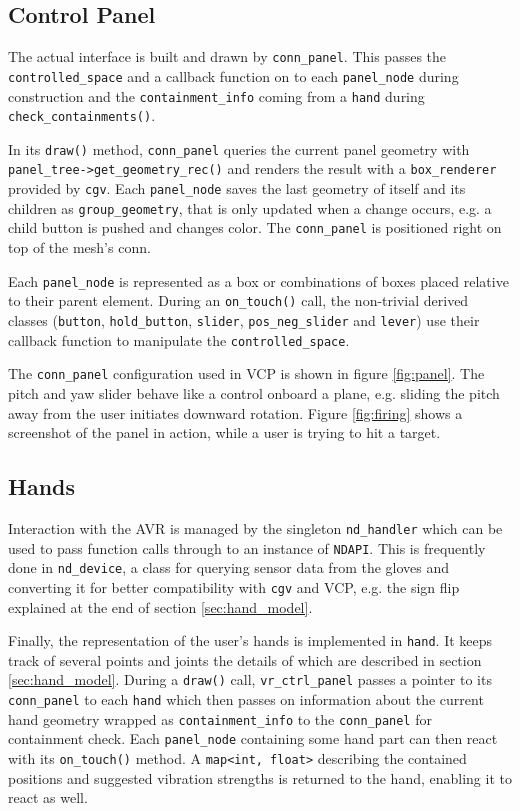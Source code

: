 \documentclass[hyperref, bachelorofscience]{cgvpub}
\begin{document}
\subsection{Control Panel}
The actual interface is built and drawn by \lstinline|conn_panel|. This passes the \lstinline|controlled_space| and a callback function on to each \lstinline|panel_node| during construction and the \lstinline|containment_info| coming from a \lstinline|hand| during \lstinline|check_containments()|. 

In its \lstinline|draw()| method, \lstinline|conn_panel| queries the current panel geometry with \lstinline|panel_tree->get_geometry_rec()| and renders the result with a \lstinline|box_renderer| provided by \lstinline|cgv|. Each \lstinline|panel_node| saves the last geometry of itself and its children as \lstinline|group_geometry|, that is only updated when a change occurs, e.g. a child button is pushed and changes color. The \lstinline|conn_panel| is positioned right on top of the mesh's conn.

Each \lstinline|panel_node| is represented as a box or combinations of boxes placed relative to their parent element. During an \lstinline|on_touch()| call, the non-trivial derived classes (\lstinline|button|, \lstinline|hold_button|, \lstinline|slider|, \lstinline|pos_neg_slider| and \lstinline|lever|) use their callback function to manipulate the \lstinline|controlled_space|. 

The \lstinline|conn_panel| configuration used in \gls{VCP} is shown in figure \ref{fig:panel}. The pitch and yaw slider behave like a control onboard a plane, e.g. sliding the pitch away from the user initiates downward rotation. Figure \ref{fig:firing} shows a screenshot of the panel in action, while a user is trying to hit a target.

\subsection{Hands} \label{sec:devel:structure:hands}
Interaction with the \Gls{AVR} is managed by the singleton \lstinline|nd_handler| which can be used to pass function calls through to an instance of \lstinline|NDAPI|. This is frequently done in \lstinline|nd_device|, a class for querying sensor data from the gloves and converting it for better compatibility with \lstinline|cgv| and \gls{VCP}, e.g. the sign flip explained at the end of section \ref{sec:hand_model}.

Finally, the representation of the user's hands is implemented in \lstinline|hand|. It keeps track of several points and joints the details of which are described in section \ref{sec:hand_model}. During a \lstinline|draw()| call, \lstinline|vr_ctrl_panel| passes a pointer to its \lstinline|conn_panel| to each \lstinline|hand| which then passes on information about the current hand geometry wrapped as \lstinline|containment_info| to the \lstinline|conn_panel| for containment check. Each \lstinline|panel_node| containing some hand part can then react with its \lstinline|on_touch()| method. A \lstinline|map<int, float>| describing the contained positions and suggested vibration strengths is returned to the hand, enabling it to react as well.
\end{document}
